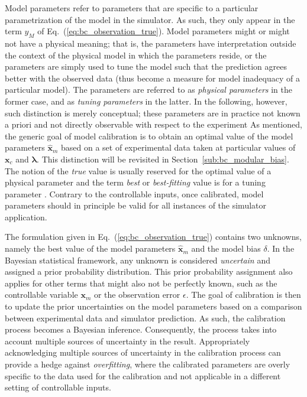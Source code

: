 Model parameters refer to parameters that are specific to a particular parametrization of the model in the simulator.
As such, they only appear in the term $y_M$ of Eq.~(\ref{eq:bc_observation_true}).
Model parameters might or might not have a physical meaning;
that is, the parameters have interpretation outside the context of the physical model in which the parameters reside, or the parameters are simply used to tune the model such that the prediction agrees better with the observed data (thus become a measure for model inadequacy of a particular model).
The parameters are referred to as \emph{physical parameters} in the former case,
and as \emph{tuning parameters} in the latter.
In the following, however, such distinction is merely conceptual;
these parameters are in practice not known a priori and not directly observable with respect to the experiment 
As mentioned, the generic goal of model calibration is to obtain an optimal value of the model parameters $\hat{\bm{x}}_m$ based on a set of experimental data taken at particular values of $\bm{x}_c$ and $\bm{\lambda}$.
This distinction will be revisited in Section~\ref{sub:bc_modular_bias}.
The notion of the \emph{true} value is usually reserved for the optimal value of a physical parameter \cite{OHagan2013} and the term \emph{best} or \emph{best-fitting} value is for a tuning parameter \cite{Bayarri2007}.
Contrary to the controllable inputs, once calibrated, model parameters should in principle be valid for all instances of the simulator application.

The formulation given in Eq.~(\ref{eq:bc_observation_true}) contains two unknowns, namely the best value of the model parameters $\hat{\bm{x}}_m$ and the model bias $\delta$.
In the Bayesian statistical framework, any unknown is considered \emph{uncertain} and assigned a prior probability distribution.
This prior probability assignment also applies for other terms that might also not be perfectly known, such as the controllable variable $\bm{x}_m$ or the observation error $\epsilon$. 
The goal of calibration is then to update the prior uncertainties on the model parameters based on a comparison between experimental data and simulator prediction.
As such, the calibration process becomes a Bayesian inference.
Consequently, the process takes into account multiple sources of uncertainty in the result.
Appropriately acknowledging multiple sources of uncertainty in the calibration process can provide a hedge against \emph{overfitting}, where the calibrated parameters are overly specific to the data used for the calibration and not applicable in a different setting of controllable inputs.

